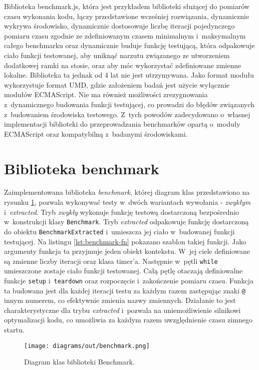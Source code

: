 Biblioteka benchmark.js, która jest przykładem biblioteki służącej do pomiarów czasu wykonania kodu, łączy przedstawione wcześniej rozwiązania, dynamicznie wykrywa środowisko, dynamicznie dostosowuje liczbę iteracji pojedynczego pomiaru czasu zgodnie ze zdefiniowanym czasem minimalnym i~maksymalnym całego benchmarku oraz dynamicznie buduje funkcję testującą, która odpakowuje ciało funkcji testowanej, aby uniknąć narzutu związanego ze utworzeniem dodatkowej ramki na stosie, oraz aby móc wykorzystać zdefiniowane zmienne lokalne. Biblioteka ta jednak od 4 lat nie jest utrzymywana. Jako format modułu wykorzystuje format UMD, gdzie założeniem badań jest użycie wyłącznie modułów ECMAScript. Nie ma również możliwości zrezygnowania z~dynamicznego budowania funkcji testującej, co prowadzi do błędów związanych z~budowaniem środowiska testowego. Z~tych powodów zadecydowano o~własnej implementacji biblioteki do przeprowadzania benchmarków opartą o~moduły ECMAScript oraz kompatybilną z~badanymi środowiskami.

\section{Biblioteka benchmark}
\label{sec:benchmark}

Zaimplementowana biblioteka \textit{benchmark}, której diagram klas przedstawiono na rysunku \ref{fig:benchmark-puml}, pozwala wykonywać testy w~dwóch wariantach wywołania - \textit{zwykłym} i~\textit{extracted}. Tryb \textit{zwykły} wykonuje funkcję testową dostarczoną bezpośrednio w~konstrukcji klasy \lstinline{Benchmark}. Tryb \textit{extracted} odpakowuje funkcję dostarczoną do obiektu \lstinline{BenchmarkExtracted} i~umieszcza jej ciało w~budowanej funkcji testującej. Na listingu \ref{lst:benchmark-fn} pokazano szablon takiej funkcji. Jako argumenty funkcja ta przyjmuje jeden obiekt kontekstu. W~jej ciele definiowane są zmienne liczby iteracji oraz klasa timer'a. Następnie w~pętli \lstinline{while} umieszczone zostaje ciało funkcji testowanej. Całą pętlę otaczają definiowalne funkcje \lstinline{setup} i~\lstinline{teardown} oraz rozpoczęcie i~zakończenie pomiaru czasu. Funkcja ta budowana jest dla każdej iteracji testu za każdym razem zastępując znaki \lstinline{@} innym numerem, co efektywnie zmienia nazwy zmiennych. Działanie to jest charakterystyczne dla trybu \textit{extracted} i~pozwala na uniemożliwienie silnikowi optymalizacji kodu, co umożliwia za każdym razem uwzględnienie czasu zimnego startu.

\begin{figure}
  \centering
  \texttt{[image: diagrams/out/benchmark.png]}
  \caption{Diagram klas biblioteki Benchmark.}
  \label{fig:benchmark-puml}
\end{figure}
\clearpage


